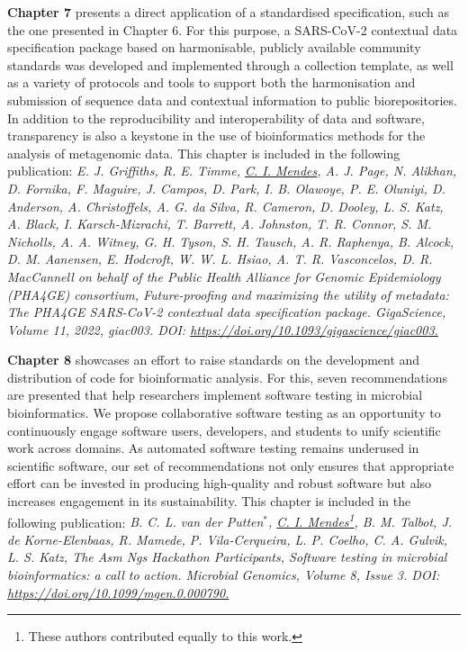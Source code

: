 \textbf{Chapter 7} presents a direct application of a standardised specification, such as the one presented in Chapter 6. For this purpose, a SARS-CoV-2 contextual data specification package based on harmonisable, publicly available community standards was developed and implemented through a collection template, as well as a variety of protocols and tools to support both the harmonisation and submission of sequence data and contextual information to public biorepositories. In addition to the reproducibility and interoperability of data and software, transparency is also a keystone in the use of bioinformatics methods for the analysis of metagenomic data. This chapter is included in the following publication: \textit{E. J. Griffiths, R. E. Timme, \underline{C. I. Mendes}, A. J. Page, N. Alikhan, D. Fornika, F. Maguire, J. Campos, D. Park, I. B. Olawoye, P. E. Oluniyi, D. Anderson, A. Christoffels, A. G. da Silva, R. Cameron, D. Dooley, L. S. Katz, A. Black, I. Karsch-Mizrachi, T. Barrett, A. Johnston, T. R. Connor, S. M. Nicholls, A. A. Witney, G. H. Tyson, S. H. Tausch, A. R. Raphenya, B. Alcock, D. M. Aanensen, E. Hodcroft, W. W. L. Hsiao, A. T. R. Vasconcelos, D. R. MacCannell on behalf of the Public Health Alliance for Genomic Epidemiology (PHA4GE) consortium, Future-proofing and maximizing the utility of metadata: The PHA4GE SARS-CoV-2 contextual data specification package. GigaScience, Volume 11, 2022, giac003. DOI: \url{https://doi.org/10.1093/gigascience/giac003.}} 

\textbf{Chapter 8} showcases an effort to raise standards on the development and distribution of code for bioinformatic analysis. For this, seven recommendations are presented that help researchers implement software testing in microbial bioinformatics. We propose collaborative software testing as an opportunity to continuously engage software users, developers, and students to unify scientific work across domains. As automated software testing remains underused in scientific software, our set of recommendations not only ensures that appropriate effort can be invested in producing high-quality and robust software but also increases engagement in its sustainability. This chapter is included in the following publication: \textit{B. C. L. van der Putten$^*$, \underline{C. I. Mendes}\footnote[1]{These authors contributed equally to this work.}, B. M. Talbot, J. de Korne-Elenbaas, R. Mamede, P. Vila-Cerqueira, L. P. Coelho, C. A. Gulvik, L. S. Katz, The Asm Ngs Hackathon Participants, Software testing in microbial bioinformatics: a call to action. Microbial Genomics, Volume 8, Issue 3. DOI: \url{https://doi.org/10.1099/mgen.0.000790.}}

